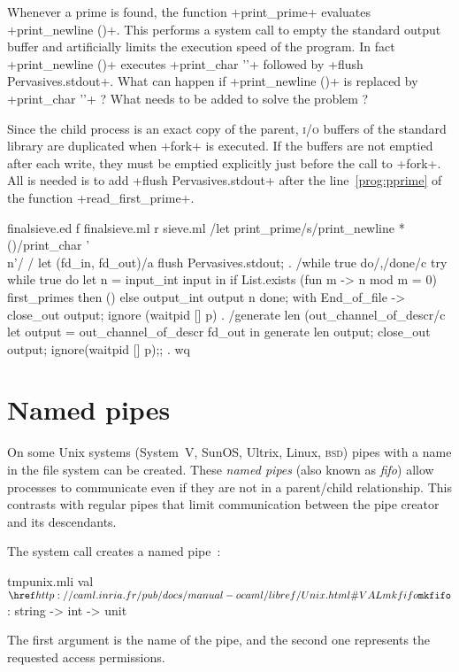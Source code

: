 \begin{exercise}
Whenever a prime is found, the function \ml+print_prime+ evaluates
\ml+print_newline ()+. This performs a system call to empty the standard
output buffer and artificially limits the execution speed of the program.
In fact \ml+print_newline ()+ executes \ml+print_char '\n'+
followed by \ml+flush Pervasives.stdout+. What can happen if
\ml+print_newline ()+ is replaced by \ml+print_char '\n'+ ? What needs
to be added to solve the problem ?
\end{exercise}
\begin{answer}
Since the child process is an exact copy of the parent, \textsc{i/o}
buffers of the standard library are duplicated when \ml+fork+ is
executed. If the buffers are not emptied after each write,
they must be emptied explicitly just before the call to
\ml+fork+. All is needed is to add 
\ml+flush Pervasives.stdout+ after the line~\ref{prog:pprime} of the 
function \ml+read_first_prime+.
\end{answer}
%
\begin{codefile}{finalsieve.ed}
f finalsieve.ml
r sieve.ml
/let print_prime/s/print_newline *()/print_char '\\n'/
/    let (fd_in, fd_out)/a
    flush Pervasives.stdout;
.
/while true do/,/done/c
        try 
          while true do
            let n = input_int input in
            if List.exists (fun m -> n mod m = 0) first_primes then ()
            else output_int output n
          done;
        with End_of_file -> 
          close_out output;
          ignore (waitpid [] p)
.
/generate len (out_channel_of_descr/c
      let output = out_channel_of_descr fd_out in
      generate len output;
      close_out output;
      ignore(waitpid [] p);;
.
wq
\end{codefile}

\section{Named pipes}

On some Unix systems (System~V, SunOS, Ultrix, Linux, \textsc{bsd})
pipes with a name in the file system can be created. These \emph{named
  pipes} (also known as \emph{fifo}) allow processes to communicate
even if they are not in a parent/child relationship. This contrasts
with regular pipes that limit communication between the pipe creator
and its descendants.

The system call  creates a named pipe~: 
%
\begin{listingcodefile}{tmpunix.mli}
val $\indexlibvalue{Unix}{mkfifo}$ : string -> int -> unit
\end{listingcodefile}
%
The first argument is the name of the pipe, and the second one represents the
requested access permissions.

